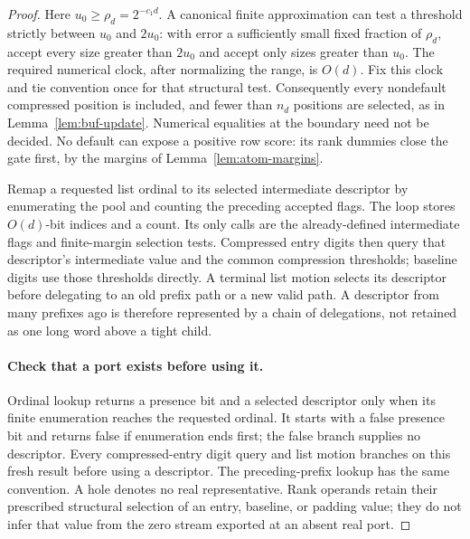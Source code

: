 \documentclass[11pt]{article}
\numberwithin{equation}{section}
\theoremstyle{definition}
\theoremstyle{remark}
\begin{document}
\begin{proof}
Here $u_0\ge\rho_d=2^{-c_1d}$.  A canonical finite approximation can
test a threshold strictly between $u_0$ and $2u_0$: with error a
sufficiently small fixed fraction of $\rho_d$, accept every size
greater than $2u_0$ and accept only sizes greater than $u_0$.
The required numerical clock, after normalizing the range, is $O(d)$.
Fix this clock and tie convention once for that structural test.
Consequently every nondefault compressed position is included, and
fewer than $n_d$ positions are selected, as in
Lemma~\ref{lem:buf-update}.  Numerical equalities at the boundary need
not be decided.  No default can expose a positive row score: its
rank dummies close the gate first, by the margins of
Lemma~\ref{lem:atom-margins}.

Remap a requested list ordinal to its selected intermediate descriptor
by enumerating the pool and counting the preceding accepted flags.
The loop stores $O(d)$-bit indices and a count.  Its only calls are the
already-defined intermediate flags and finite-margin selection tests.
Compressed entry digits then query that descriptor's intermediate value
and the common compression thresholds; baseline digits use those
thresholds directly.  A terminal list motion selects its descriptor
before delegating to an old prefix path or a new valid path.  A
descriptor from many prefixes ago is therefore represented by a chain
of delegations, not retained as one long word above a tight child.

\paragraph{Check that a port exists before using it.}
Ordinal lookup returns a presence bit and a selected descriptor only
when its finite enumeration reaches the requested ordinal. It starts
with a false presence bit and returns false if enumeration ends first;
the false branch supplies no descriptor. Every compressed-entry digit
query and list motion branches on this fresh result before using a
descriptor. The preceding-prefix lookup has the same convention.
A hole denotes no real representative. Rank operands retain their
prescribed structural selection of an entry, baseline, or padding
value; they do not infer that value from the zero stream exported
at an absent real port.


\end{proof}
\end{document}
